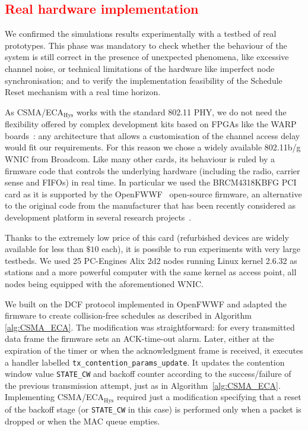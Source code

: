 \textcolor{red}{\section{Real hardware implementation}\label{EDCA}}

We confirmed the simulations results experimentally with a testbed of real prototypes. This phase was mandatory to check whether the behaviour of the system is still correct in the presence of unexpected phenomena, like excessive channel noise, or technical limitations of the hardware like imperfect node synchronisation; and to verify the implementation feasibility of the Schedule Reset mechanism with a real time horizon.

As CSMA/ECA$_{\text{Hys}}$ works with the standard 802.11 PHY, we do not need the flexibility offered by complex development kits based on FPGAs like the WARP boards~\cite{amiri2007warp}: any architecture that allows a customisation of the channel access delay would fit our requirements. For this reason we chose a widely available 802.11b/g WNIC from Broadcom. Like many other cards, its behaviour is ruled by a firmware code that controls the underlying hardware (including the radio, carrier sense and FIFOs) in real time. In particular we used the BRCM4318KBFG PCI card as it is supported by the OpenFWWF~\cite{OpenFWWF} open-source firmware, an alternative to the original code from the manufacturer that has been recently considered as development platform in several research projects~\cite{WMP,gringolitmc14,gringoliccr14,berger14,CF-MAC}. 

Thanks to the extremely low price of this card (refurbished devices are widely available for less than $\$10$ each), it is possible to run experiments with very large testbeds. We used 25 PC-Engines Alix 2d2 nodes running Linux kernel 2.6.32 as stations and a more powerful computer with the same kernel as access point, all nodes being equipped with the aforementioned WNIC.

We built on the DCF protocol implemented in OpenFWWF and adapted the firmware to create collision-free schedules as described in Algorithm \ref{alg:CSMA_ECA}. The modification was straightforward: for every transmitted data frame the firmware sets an ACK-time-out alarm. Later, either at the expiration of the timer or when the acknowledgment frame is received, it executes a handler labelled {\tt tx\_contention\_params\_update}. It updates the contention window value {\tt STATE\_CW} and backoff counter according to the success/failure of the previous transmission attempt, just as in Algorithm~\ref{alg:CSMA_ECA}. Implementing CSMA/ECA$_{\text{Hys}}$ required just a modification specifying that a reset of the backoff stage (or {\tt STATE\_CW} in this case) is performed only when a packet is dropped or when the MAC queue empties.

